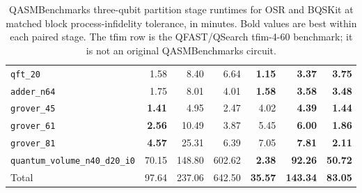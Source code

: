 \begin{table}[p]
\begin{tabular}{l|rrr|rrr}
\texttt{qft\_20} & 1.58 & 8.40 & 6.64 & \textbf{1.15} & \textbf{3.37} & \textbf{3.75} \\
\texttt{adder\_n64} & 1.75 & 8.01 & 4.01 & \textbf{1.58} & \textbf{3.58} & \textbf{3.48} \\
\texttt{grover\_45} & \textbf{1.41} & 4.95 & 2.47 & 4.02 & \textbf{4.39} & \textbf{1.44} \\
\texttt{grover\_61} & \textbf{2.56} & 10.49 & 3.87 & 5.45 & \textbf{6.00} & \textbf{1.86} \\
\texttt{grover\_81} & \textbf{4.57} & 25.31 & 6.39 & 7.05 & \textbf{7.81} & \textbf{2.11} \\
\texttt{quantum\_volume\_n40\_d20\_i0} & 70.15 & 148.80 & 602.62 & \textbf{2.38} & \textbf{92.26} & \textbf{50.72} \\
\hline
Total & 97.64 & 237.06 & 642.50 & \textbf{35.57} & \textbf{143.34} & \textbf{83.05} \\
\hline
\end{tabular}
\caption{QASMBenchmarks three-qubit partition stage runtimes for OSR and BQSKit at matched block process-infidelity tolerance, in minutes. Bold values are best within each paired stage. The tfim row is the QFAST/QSearch tfim-4-60 benchmark; it is not an original QASMBenchmarks circuit.}
\label{tab:osr-bqskit-three-qubit-qasm-benchmarks-times}
\end{table}

